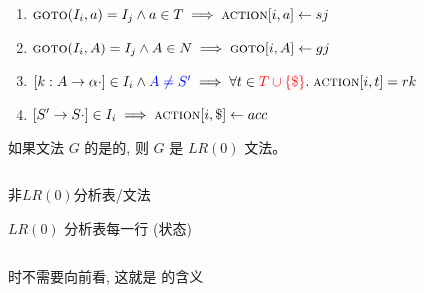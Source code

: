 \begin{frame}{}
  \begin{center}

    \vspace{0.60cm}
    \begin{enumerate}[(1)]
      \setlength{\itemsep}{25pt}
      \item $\textsc{goto}(I_{i}, a) = I_{j} \land a \in T \implies \textsc{action}[i, a] \gets sj$
      \item $\textsc{goto}(I_{i}, A) = I_{j} \land A \in N \implies \textsc{goto}[i, A] \gets gj$
      \item $[k: A \to \alpha \cdot] \in I_{i} \land \textcolor{blue}{A \neq S'} \implies
        \forall t \in \textcolor{red}{T \cup \{\$\}}.\; \textsc{action}[i, t] = rk$
      \item $[S' \to S \cdot] \in I_{i} \implies \textsc{action}[i, \$] \gets acc$
    \end{enumerate}
  \end{center}
\end{frame}

\begin{frame}{}
  \begin{definition}[$LR(0)$文法]
    如果文法 $G$ 的是的,
    则 $G$ 是 $LR(0)$ 文法。
  \end{definition}

  \begin{center}
    \begin{columns}
        
    \end{columns}

    \vspace{0.20cm}
    非$LR(0)$分析表/文法
  \end{center}
\end{frame}

\begin{frame}{}
  \begin{center}
    $LR(0)$ 分析表每一行 (状态) 

    \begin{columns}
        
    \end{columns}

    \vspace{0.20cm}
    时不需要向前看, 这就是  的含义
  \end{center}
\end{frame}

